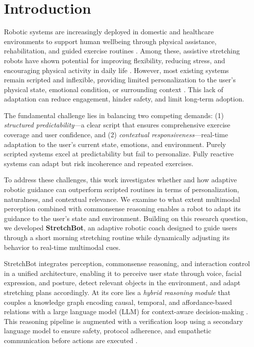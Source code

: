 \section{Introduction}
\label{sec:intro}

Robotic systems are increasingly deployed in domestic and healthcare environments to support human wellbeing through physical assistance, rehabilitation, and guided exercise routines \cite{ref1,ref2}. Among these, assistive stretching robots have shown potential for improving flexibility, reducing stress, and encouraging physical activity in daily life \cite{ref3}. However, most existing systems remain scripted and inflexible, providing limited personalization to the user's physical state, emotional condition, or surrounding context \cite{ref4}. This lack of adaptation can reduce engagement, hinder safety, and limit long-term adoption.

The fundamental challenge lies in balancing two competing demands: (1) \textit{structured predictability}—a clear script that ensures comprehensive exercise coverage and user confidence, and (2) \textit{contextual responsiveness}—real-time adaptation to the user's current state, emotions, and environment. Purely scripted systems excel at predictability but fail to personalize. Fully reactive systems can adapt but risk incoherence and repeated exercises.

To address these challenges, this work investigates whether and how adaptive robotic guidance can outperform scripted routines in terms of personalization, naturalness, and contextual relevance. We examine to what extent multimodal perception combined with commonsense reasoning enables a robot to adapt its guidance to the user's state and environment. Building on this research question, we developed \textbf{StretchBot}, an adaptive robotic coach designed to guide users through a short morning stretching routine while dynamically adjusting its behavior to real-time multimodal cues.

StretchBot integrates perception, commonsense reasoning, and interaction control in a unified architecture, enabling it to perceive user state through voice, facial expression, and posture, detect relevant objects in the environment, and adapt stretching plans accordingly. At its core lies a \textit{hybrid reasoning module} that couples a knowledge graph encoding causal, temporal, and affordance-based relations with a large language model (LLM) for context-aware decision-making \cite{ref5,ref26}. This reasoning pipeline is augmented with a verification loop using a secondary language model to ensure safety, protocol adherence, and empathetic communication before actions are executed \cite{ref28}.

